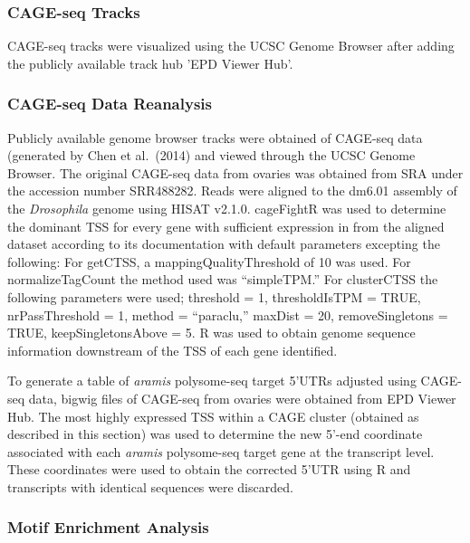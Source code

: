 \documentclass[12pt,oneside]{reedthesis}
\begin{document}
\hypertarget{cage-seq-tracks}{%
\subsubsection{CAGE-seq Tracks}\label{cage-seq-tracks}}

CAGE-seq tracks were visualized using the UCSC Genome Browser after adding the publicly available track hub 'EPD Viewer Hub'.

\hypertarget{cage-seq-data-reanalysis}{%
\subsubsection{CAGE-seq Data Reanalysis}\label{cage-seq-data-reanalysis}}

Publicly available genome browser tracks were obtained of CAGE-seq data (generated by Chen et al.~(2014) and viewed through the UCSC Genome Browser. The original CAGE-seq data from ovaries was obtained from SRA under the accession number SRR488282. Reads were aligned to the dm6.01 assembly of the \emph{Drosophila} genome using HISAT v2.1.0. cageFightR was used to determine the dominant TSS for every gene with sufficient expression in from the aligned dataset according to its documentation with default parameters excepting the following: For getCTSS, a mappingQualityThreshold of 10 was used. For normalizeTagCount the method used was ``simpleTPM.'' For clusterCTSS the following parameters were used; threshold = 1, thresholdIsTPM = TRUE, nrPassThreshold = 1, method = ``paraclu,'' maxDist = 20, removeSingletons = TRUE, keepSingletonsAbove = 5. R was used to obtain genome sequence information downstream of the TSS of each gene identified.

To generate a table of \emph{aramis} polysome-seq target 5'UTRs adjusted using CAGE-seq data, bigwig files of CAGE-seq from ovaries were obtained from EPD Viewer Hub. The most highly expressed TSS within a CAGE cluster (obtained as described in this section) was used to determine the new 5'-end coordinate associated with each \emph{aramis} polysome-seq target gene at the transcript level. These coordinates were used to obtain the corrected 5'UTR using R and transcripts with identical sequences were discarded.

\hypertarget{motif-enrichment-analysis}{%
\subsubsection{Motif Enrichment Analysis}\label{motif-enrichment-analysis}}
\end{document}
